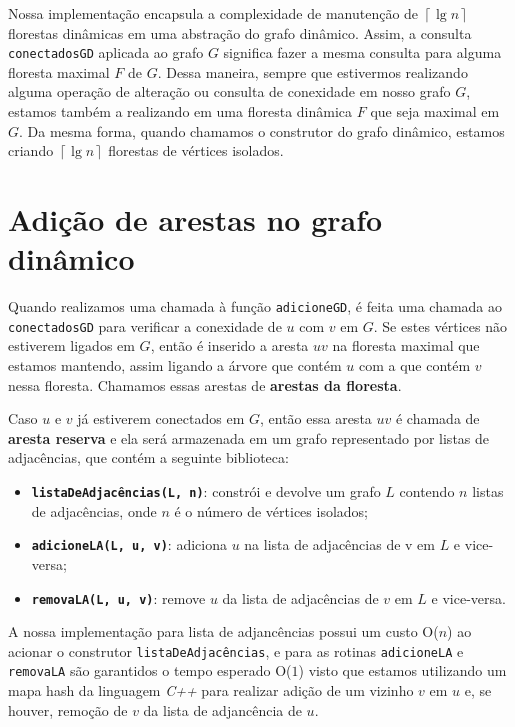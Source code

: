 Nossa implementação encapsula a complexidade de manutenção de $\left\lceil \lg n \right\rceil$ florestas dinâmicas em uma abstração do grafo dinâmico. 
Assim, a consulta \texttt{conectadosGD} aplicada ao grafo $G$ significa fazer a mesma consulta para alguma floresta maximal $F$ de $G$. Dessa maneira, sempre que estivermos realizando alguma operação de alteração ou consulta de conexidade em nosso grafo $G$, estamos também a realizando em uma floresta dinâmica $F$ que seja maximal em $G$. Da mesma forma, quando chamamos o construtor do grafo dinâmico, estamos criando $\left\lceil \lg n \right\rceil$ florestas de vértices isolados.

\section{Adição de arestas no grafo dinâmico}
\label{sec:dynamic-graph-edge-addition}

Quando realizamos uma chamada à função \texttt{adicioneGD}, é feita uma chamada ao \texttt{conectadosGD} para verificar a conexidade de $u$ com $v$ em $G$. Se estes vértices não estiverem ligados em $G$, então é inserido a aresta $uv$ na floresta maximal que estamos mantendo, assim ligando a árvore que contém $u$ com a que contém $v$ nessa floresta. Chamamos essas arestas de \textbf{arestas da floresta}.

Caso $u$ e $v$ já estiverem conectados em $G$, então essa aresta $uv$ é chamada de \textbf{aresta reserva} e ela será armazenada em um grafo representado por listas de adjacências, que contém a seguinte biblioteca:

\begin{itemize}
    \item \texttt{\textbf{listaDeAdjacências(L, n)}}: constrói e devolve um grafo $L$ contendo $n$ listas de adjacências, onde $n$ é o número de vértices isolados;
    \item \texttt{\textbf{adicioneLA(L, u, v)}}: adiciona $u$ na lista de adjacências de v em $L$ e vice-versa;
    \item \texttt{\textbf{removaLA(L, u, v)}}: remove $u$ da lista de adjacências de $v$ em $L$ e vice-versa.
\end{itemize} 

A nossa implementação \cite{chung2025} para lista de adjancências possui um custo O($n$) ao acionar o construtor \texttt{listaDeAdjacências}, e para 
as rotinas \texttt{adicioneLA} e \texttt{removaLA} são garantidos o tempo esperado O($1$) visto que estamos utilizando um mapa hash da linguagem \textit{C++} para realizar adição de um vizinho $v$ em $u$ e, se houver, remoção de $v$ da lista de adjancência de $u$.

